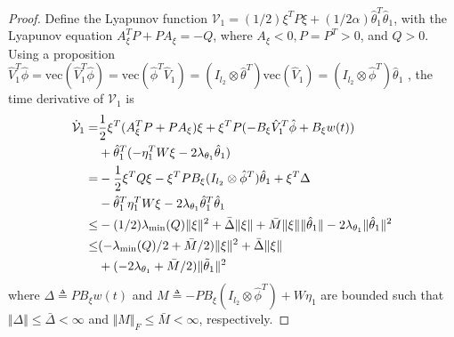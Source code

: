 \documentclass[letterpaper, 10 pt, conference]{ieeeconf}  %
\begin{document}
\begin{proof}
Define the Lyapunov function $\mathcal V_1=(1/2)\xi^TP\xi+(1/2\alpha)\hat\theta_1^T\hat\theta_1$, with the Lyapunov equation $A_\xi^TP+PA_\xi=-Q$, where $A_\xi<0,P=P^T>0$, and $Q>0$.
Using a proposition $\hat V_1^T\hat\phi = \text{vec}(\hat V_1^T\hat\phi)=\text{vec}(\hat\phi^T\hat V_1) = (I_{l_2}\otimes \hat\theta^T)\text{vec}(\hat V_1)=(I_{l_2}\otimes \hat\phi^T)\hat\theta_1$ \cite[Proposition~(7.1.9)]{RN22}, the time derivative of $\mathcal V_1$ is
\begin{equation}
    \begin{aligned}
        \dot {\mathcal V}_1 =& {1\over 2}\xi^T(A_\xi^TP+PA_\xi)\xi+\xi ^TP ( -B_\xi\hat V_1^T\hat \phi   +B_\xi w(t) )\\
        &+\hat\theta_1^T
        (
            -\eta_1^TW \xi-2\lambda_{\theta_1} \hat\theta_1 
        )
        \\
        =& -{1\over 2}\xi^TQ\xi -\xi^TPB_\xi(I_{l_2}\otimes \hat\phi^T)\hat\theta_1 +\xi^T\Delta
        \\
        &
        -\hat\theta_1^T\eta_1^TW\xi
        -2\lambda_{\theta_1} \hat\theta_1^T\hat\theta_1
        \\
        \le& -(1/2)\lambda_\text{min}(Q)\Vert \xi\Vert ^2
        +\bar\Delta \Vert \xi\Vert  
        +\bar M\Vert \xi\Vert  \Vert \hat\theta_1\Vert
        -2\lambda_{\theta_1}
        \Vert\hat\theta_1\Vert ^2
        \\
        \le& 
        (
        -{\lambda_\text{min}(Q)/ 2} +{\bar M/ 2}
        )
        \Vert \xi\Vert ^2 +\bar\Delta \Vert \xi\Vert  
        \\
        &+ 
        (
        -2\lambda_{\theta_1} 
        +\bar M/ 2
        )
        \Vert \tilde\theta_1\Vert ^2 
        \end{aligned}
        \label{eq. lya 1}
\end{equation}
where $\Delta\triangleq PB_\xi w(t)$ and $M\triangleq  -PB_\xi(I_{l_2}\otimes \hat\phi^T)+W\eta_1$ are bounded such that $\Vert\Delta\Vert\le\bar\Delta<\infty$ and $\Vert M\Vert_F\le \bar M< \infty$, respectively.


\end{proof}
\end{document}
